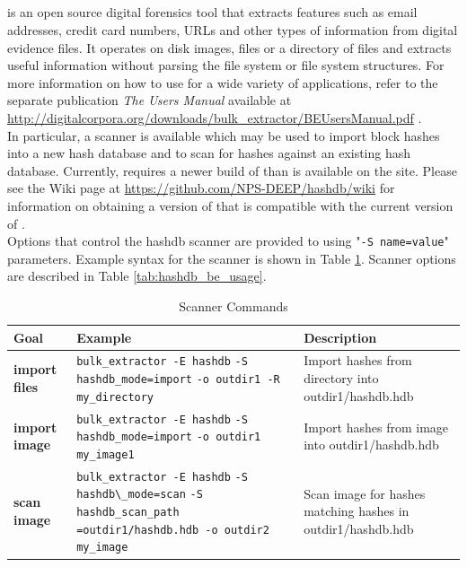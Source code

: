 \documentclass[11pt,fleqn]{article} %
\begin{document}
\subsection{\bulk}
\bulk is an open source digital forensics tool that extracts features such as email addresses, credit card numbers, URLs and other types of information from digital evidence files. It operates on disk images, files or a directory of files and extracts useful information without parsing the file system or file system structures.  For more information on how to use \bulk for a wide variety of applications, refer to the separate publication \textit{The \bulk Users Manual} available at \url{http://digitalcorpora.org/downloads/bulk_extractor/BEUsersManual.pdf} \cite{beusersguide}.\\

In particular, a \hdb \bulk scanner is available which may be used to import block hashes into a new hash database and to scan for hashes against an existing hash database.
Currently, \hdb requires a newer build of \bulk than is available on the \bulk site.
Please see the \hdb Wiki page at \url{https://github.com/NPS-DEEP/hashdb/wiki}
for information on obtaining a version of \bulk that is compatible with the current version of \hdb.\\

Options that control the hashdb
scanner are provided to \bulk using "\verb+-S name=value+" parameters.
Example syntax for the \bulk \hdb scanner is shown in Table \ref{tab:hashdbScanner}.
Scanner options are described in Table \ref{tab:hashdb_be_usage}.

\begin{table}[!ht]
\centering
\caption{\bulk \hdb Scanner Commands}
\label{tab:hashdbScanner}
\begin{tabular}{|p{3.5 cm}|p{6 cm}|p{4 cm}|}
\hline \hline
\textbf{Goal} & \textbf{Example} & \textbf{Description} \\
\hline
\textbf{import files} & \verb+bulk_extractor -E hashdb+ \verb+-S hashdb_mode=import+ \verb+-o outdir1 -R my_directory+ & Import hashes from directory into outdir1/hashdb.hdb\\
\hline
\textbf{import image} & \verb+bulk_extractor -E hashdb+ \verb+-S hashdb_mode=import+ \verb+-o outdir1 my_image1+ & Import hashes from image into outdir1/hashdb.hdb\\
\hline
\textbf{scan image} & \verb+bulk_extractor -E hashdb+ \verb+-S hashdb\_mode=scan+ \verb+-S hashdb_scan_path+ \verb+=outdir1/hashdb.hdb -o outdir2+ \verb+my_image+ & Scan image for hashes matching hashes in outdir1/hashdb.hdb\\
\hline
\end{tabular}
\end{table}
\end{document}
